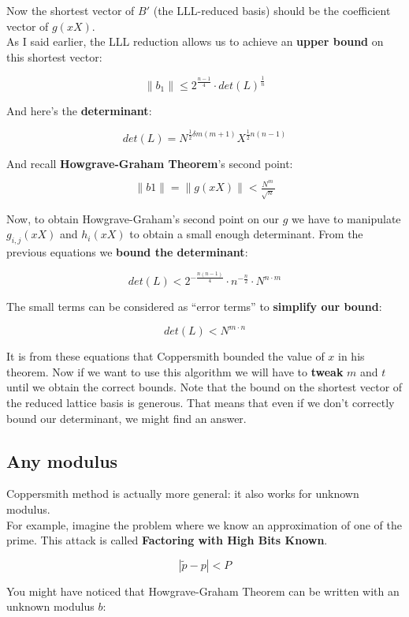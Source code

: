 \documentclass[a4paper,11pt]{article}
\begin{document}
Now the shortest vector of $B'$ (the LLL-reduced basis) should be the coefficient vector of $g(xX)$. \\

As I said earlier, the LLL reduction allows us to achieve an \textbf{upper bound} on this shortest vector:

\[ \|b_1\| \leq 2^{\frac{n-1}{4}} \cdot det(L)^{\frac{1}{n}} \]

And here's the \textbf{determinant}:

\[ det(L) = N^{\frac{1}{2}\delta m (m+1)}X^{\frac{1}{2}n(n-1)} \]

And recall \textbf{Howgrave-Graham Theorem}'s second point:

\[ \|b1\| = \|g(xX)\| < \frac{_{N^m}}{^{\sqrt{n}}} \]

Now, to obtain Howgrave-Graham's second point on our $g$ we have to manipulate $g_{i,j}(xX)$ and $h_i(xX)$ to obtain a small enough determinant. From the previous equations we \textbf{bound the determinant}:

\[ det(L) < 2^{-\frac{n(n-1)}{4}} \cdot n^{-\frac{n}{2}} \cdot N^{n \cdot m} \]

The small terms can be considered as ``error terms'' to \textbf{simplify our bound}:

\[ det(L) < N^{m \cdot n}\]

It is from these equations that Coppersmith bounded the value of $x$ in his theorem. Now if we want to use this algorithm we will have to \textbf{tweak} $m$ and $t$ until we obtain the correct bounds. Note that the bound on the shortest vector of the reduced lattice basis is generous. That means that even if we don't correctly bound our determinant, we might find an answer.

\subsection{Any modulus}\label{anymodulus}

Coppersmith method is actually more general: it also works for unknown modulus.\\
For example, imagine the problem where we know an approximation of one of the prime. This attack is called \textbf{Factoring with High Bits Known}.

\[ |\tilde{p} - p| < P \]


You might have noticed that Howgrave-Graham Theorem can be written with an unknown modulus $b$:
\end{document}
